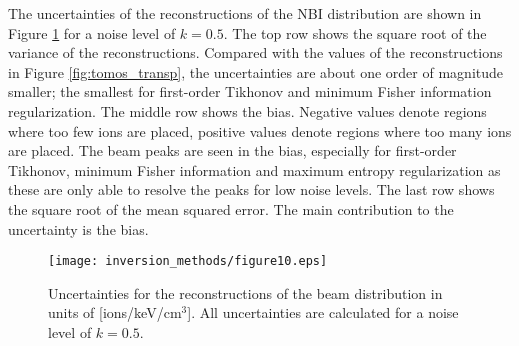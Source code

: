 The uncertainties of the reconstructions of the NBI distribution are shown in Figure \ref{fig:uncertainties_transp} for a noise level of $k=0.5$.
The top row shows the square root of the variance of the reconstructions. 
Compared with the values of the reconstructions in Figure \ref{fig:tomos_transp}, the uncertainties are about one order of magnitude smaller; the smallest for first-order Tikhonov and minimum Fisher information regularization. 
The middle row shows the bias.
Negative values denote regions where too few ions are placed, positive values denote regions where too many ions are placed.
The beam peaks are seen in the bias, especially for first-order Tikhonov, minimum Fisher information and maximum entropy regularization as these are only able to resolve the peaks for low noise levels.
The last row shows the square root of the mean squared error. 
The main contribution to the uncertainty is the bias.
\begin{figure}[h!]
    \centering
    \texttt{[image: inversion\_methods/figure10.eps]}
    \caption{Uncertainties for the reconstructions of the beam distribution in units of [ions/keV/cm$^3$]. All uncertainties are calculated for a noise level of $k=0.5$.}
    \label{fig:uncertainties_transp}
\end{figure}

